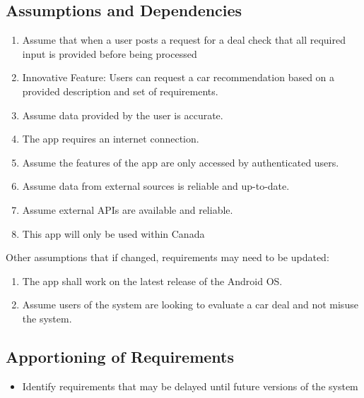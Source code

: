 \documentclass[]{article}
\begin{document}
\subsection{Assumptions and Dependencies}
\label{sub:assumptions_and_dependencies}
\begin{enumerate}
\item Assume that when a user posts a request for a deal check that all required input is provided before being processed
\item Innovative Feature: Users can request a car recommendation based on a provided description and set of requirements.
\item Assume data provided by the user is accurate.
\item The app requires an internet connection.
\item Assume the features of the app are only accessed by authenticated users.
\item Assume data from external sources is reliable and up-to-date.
\item Assume external APIs are available and reliable.
\item This app will only be used within Canada
\end{enumerate}

Other assumptions that if changed, requirements may need to be updated:
\begin{enumerate}
\item The app shall work on the latest release of the Android OS.
\item Assume users of the system are looking to evaluate a car deal and not misuse the system.
\end{enumerate}

\subsection{Apportioning of Requirements}
\label{sub:apportioning_of_requirements}
\begin{itemize}
	\item Identify requirements that may be delayed until future versions of the system
\end{itemize}

\newpage
\end{document}

